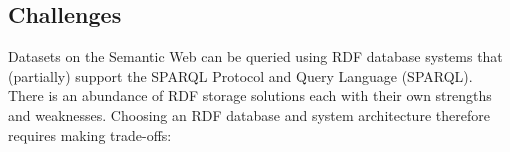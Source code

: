 \documentclass[twocolumn]{bmcart}%
\begin{document}
\subsection{Challenges}

Datasets on the Semantic Web can be queried using RDF database systems that (partially) support the SPARQL Protocol and Query Language (SPARQL). There is an abundance of RDF storage solutions each with their own strengths and weaknesses.
Choosing an RDF database and system architecture therefore requires making trade-offs: 
\end{document}
